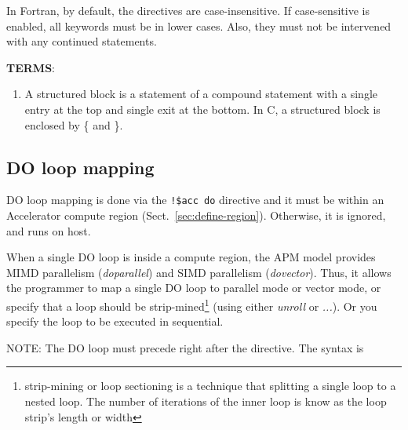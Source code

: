 In Fortran, by default, the directives are case-insensitive. If
case-sensitive is enabled, all keywords must be in lower cases. Also,
they must not be intervened with any continued statements.

{\bf TERMS}:
\begin{enumerate}
\item A structured block is a statement of a compound statement with a
  single entry at the top and single exit at the bottom. In C, a
  structured block is enclosed by \{  and \}. 
\end{enumerate}
\subsection{DO loop mapping}
\label{sec:do-loop-mapping}

DO loop mapping is done via the \verb.!$acc do. directive and it must
be within an Accelerator compute region
(Sect.~\ref{sec:define-region}). Otherwise, it is ignored, and runs on
host. 

When a single DO loop is inside a compute region, the APM model
provides MIMD parallelism ({\it doparallel}) and SIMD parallelism
({\it dovector}).  Thus, it allows the programmer to map a single DO
loop to parallel mode or vector mode, or specify that a loop should be
strip-mined\footnote{strip-mining or loop sectioning is a technique
  that splitting a single loop to a nested loop. The number of
  iterations of the inner loop is know as the loop strip's length or
  width}
(using either {\it unroll} or {\it ...}). Or you specify the loop to
be executed in sequential.

NOTE: The DO loop must precede right after the directive. The syntax
is

